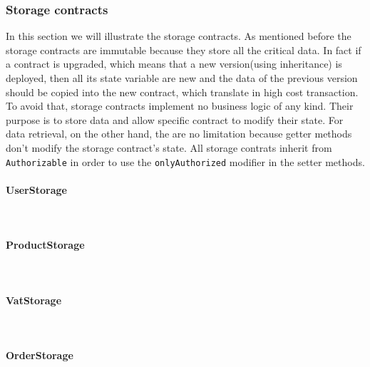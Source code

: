 \subsubsection{Storage contracts}
In this section we will illustrate the storage contracts. As mentioned before the storage contracts are immutable because they store all the critical data. In fact if a contract is upgraded, which means that a new version(using inheritance) is deployed, then all its state variable are new and the data of the previous version should be copied into the new contract, which translate in high cost transaction.\\
To avoid that, storage contracts implement no business logic of any kind. Their purpose is to store data and allow specific contract to modify their state. For data retrieval, on the other hand, the are no limitation because getter methods don't modify the storage contract's state.
All storage contrats inherit from \texttt{Authorizable} in order to use the \texttt{onlyAuthorized} modifier in the setter methods.

\paragraph{UserStorage}\mbox{}\\
\paragraph{ProductStorage}\mbox{}\\
\paragraph{VatStorage}\mbox{}\\
\paragraph{OrderStorage}\mbox{}\\
